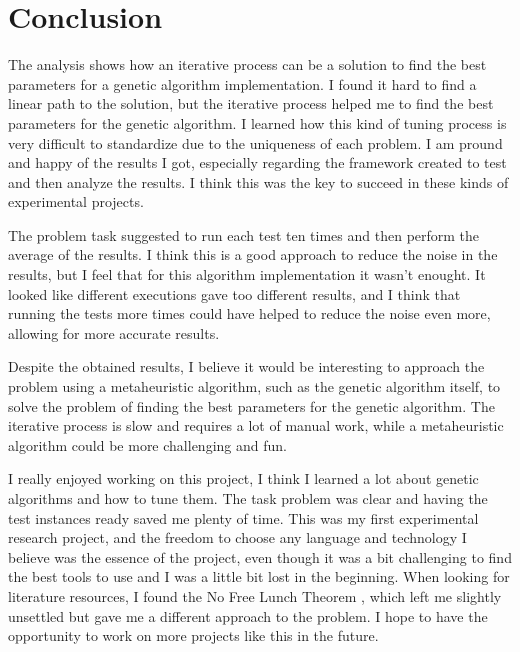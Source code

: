 \chapter*{Conclusion}

The analysis shows how an iterative process can be a solution to find the best parameters for a genetic algorithm implementation.
I found it hard to find a linear path to the solution, but the iterative process helped me to find the best parameters for the genetic algorithm. I learned how this kind of tuning process is very difficult to standardize due to the uniqueness of each problem. I am pround and happy of the results I got, especially regarding the framework created to test and then analyze the results. I think this was the key to succeed in these kinds of experimental projects.

The problem task suggested to run each test ten times and then perform the average of the results. I think this is a good approach to reduce the noise in the results, but I feel that for this algorithm implementation it wasn't enought. It looked like different executions gave too different results, and I think that running the tests more times could have helped to reduce the noise even more, allowing for more accurate results.

Despite the obtained results, I believe it would be interesting to approach the problem using a metaheuristic algorithm, such as the genetic algorithm itself, to solve the problem of finding the best parameters for the genetic algorithm. The iterative process is slow and requires a lot of manual work, while a metaheuristic algorithm could be more challenging and fun.

I really enjoyed working on this project, I think I learned a lot about genetic algorithms and how to tune them. The task problem was clear and having the test instances ready saved me plenty of time. This was my first experimental research project, and the freedom to choose any language and technology I believe was the essence of the project, even though it was a bit challenging to find the best tools to use and I was a little bit lost in the beginning. When looking for literature resources, I found the No Free Lunch Theorem \cite{NFL-theorem}, which left me slightly unsettled but gave me a different approach to the problem. I hope to have the opportunity to work on more projects like this in the future.


